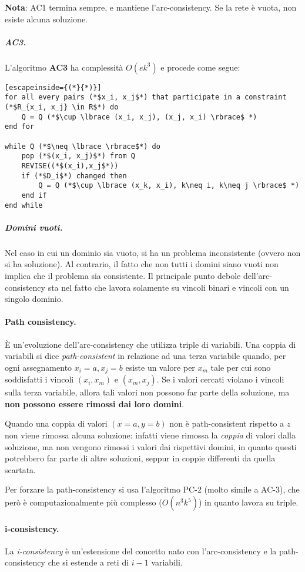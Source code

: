 \documentclass[a4paper, 11pt]{article}
\begin{document}
\textbf{Nota}: AC1 termina sempre, e mantiene l'arc-consistency. Se la rete è vuota, non esiste alcuna soluzione.
	
\subparagraph{AC3.} L'algoritmo \textbf{AC3} ha complessità $O(ek^3)$ e procede come segue:\begin{lstlisting}[escapeinside={(*}{*)}]
for all every pairs (*$x_i, x_j$*) that participate in a constraint (*$R_{x_i, x_j} \in R$*) do
	Q = Q (*$\cup \lbrace (x_i, x_j), (x_j, x_i) \rbrace$ *)
end for

while Q (*$\neq \lbrace \rbrace$*) do
	pop (*$(x_i, x_j)$*) from Q
	REVISE((*$(x_i),x_j$*))
	if (*$D_i$*) changed then
		Q = Q (*$\cup \lbrace (x_k, x_i), k\neq i, k\neq j \rbrace$ *)
	end if
end while
\end{lstlisting}

\subparagraph{Domini vuoti.} Nel caso in cui un dominio sia vuoto, si ha un problema inconsistente (ovvero non si ha soluzione). Al contrario, il fatto che non tutti i domini siano vuoti non implica che il problema sia consistente. Il principale punto debole dell'arc-consistency sta nel fatto che lavora solamente su vincoli binari e vincoli con un singolo dominio.

\paragraph{Path consistency.} È un'evoluzione dell'arc-consistency che utilizza triple di variabili. Una coppia di variabili si dice \textit{path-consistent} in relazione ad una terza variabile quando, per ogni assegnamento $x_i = a, x_j = b$ esiste un valore per $x_m$ tale per cui sono soddisfatti i vincoli $(x_i, x_m)$ e $(x_m, x_j)$.
Se i valori cercati violano i vincoli sulla terza variabile, allora tali valori non possono far parte della soluzione, ma \textbf{non possono essere rimossi dai loro domini}.

Quando una coppia di valori $(x=a, y=b)$ non è path-consistent rispetto a $z$ non viene rimossa alcuna soluzione: infatti viene rimossa la \textit{coppia} di valori dalla soluzione, ma non vengono rimossi i valori dai rispettivi domini, in quanto questi potrebbero far parte di altre soluzioni, seppur in coppie differenti da quella scartata.

Per forzare la path-consistency si usa l'algoritmo PC-2 (molto simile a AC-3), che però è computazionalmente più complesso ($O(n^3k^5)$) in quanto lavora su triple.

\paragraph{i-consistency.} La \textit{i-consistency} è un'estensione del concetto nato con l'arc-consistency e la path-consistency che si estende a reti di $i-1$ variabili.
\end{document}
